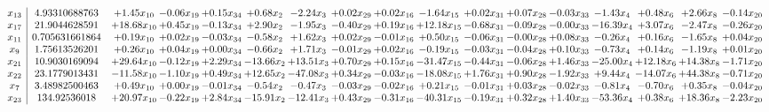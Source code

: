 \documentclass[9pt]{article}
\begin{document}
 \[\begin{array}{c| c c@{\hskip 2pt} c@{\hskip 2pt} c@{\hskip 2pt} c@{\hskip 2pt} c@{\hskip 2pt} c@{\hskip 2pt} c@{\hskip 2pt} c@{\hskip 2pt} c@{\hskip 2pt} c@{\hskip 2pt} c@{\hskip 2pt} c@{\hskip 2pt} c@{\hskip 2pt} c@{\hskip 2pt} c@{\hskip 2pt} }
 x_{13}   &  4.93310688763 & +  1.45 x_{10} & -0.06 x_{19} & +  0.15 x_{34} & +  0.68 x_{2} & -2.24 x_{3} & +  0.02 x_{29} & +  0.02 x_{16} & -1.64 x_{15} & +  0.02 x_{31} & +  0.07 x_{28} & -0.03 x_{33} & -1.43 x_{4} & +  0.48 x_{6} & +  2.66 x_{8} & -0.14 x_{20}\\
 x_{17}   &  21.9044628591 & + 18.68 x_{10} & +  0.45 x_{19} & -0.13 x_{34} & +  2.90 x_{2} & -1.95 x_{3} & -0.40 x_{29} & +  0.19 x_{16} & + 12.18 x_{15} & -0.68 x_{31} & -0.09 x_{28} & -0.00 x_{33} & -16.39 x_{4} & +  3.07 x_{6} & -2.47 x_{8} & -0.26 x_{20}\\
 x_{11}   &  0.705631661864 & +  0.19 x_{10} & +  0.02 x_{19} & -0.03 x_{34} & -0.58 x_{2} & +  1.62 x_{3} & +  0.02 x_{29} & -0.01 x_{16} & +  0.50 x_{15} & -0.06 x_{31} & -0.00 x_{28} & +  0.08 x_{33} & -0.26 x_{4} & +  0.16 x_{6} & -1.65 x_{8} & +  0.04 x_{20}\\
 x_{9}   &  1.75613526201 & +  0.26 x_{10} & +  0.04 x_{19} & +  0.00 x_{34} & -0.66 x_{2} & +  1.71 x_{3} & -0.01 x_{29} & +  0.02 x_{16} & -0.19 x_{15} & -0.03 x_{31} & -0.04 x_{28} & +  0.10 x_{33} & -0.73 x_{4} & +  0.14 x_{6} & -1.19 x_{8} & +  0.01 x_{20}\\
 x_{21}   &  10.9030169094 & + 29.64 x_{10} & -0.12 x_{19} & +  2.29 x_{34} & -13.66 x_{2} & + 13.51 x_{3} & +  0.70 x_{29} & +  0.15 x_{16} & -31.47 x_{15} & -0.44 x_{31} & -0.06 x_{28} & +  1.46 x_{33} & -25.00 x_{4} & + 12.18 x_{6} & + 14.38 x_{8} & -1.71 x_{20}\\
 x_{22}   &  23.1779013431 & -11.58 x_{10} & -1.10 x_{19} & +  0.49 x_{34} & + 12.65 x_{2} & -47.08 x_{3} & +  0.34 x_{29} & -0.03 x_{16} & -18.08 x_{15} & +  1.76 x_{31} & +  0.90 x_{28} & -1.92 x_{33} & +  9.44 x_{4} & -14.07 x_{6} & + 44.38 x_{8} & -0.71 x_{20}\\
 x_{7}   &  3.48982500463 & +  0.49 x_{10} & +  0.00 x_{19} & -0.01 x_{34} & -0.54 x_{2} & -0.47 x_{3} & -0.03 x_{29} & -0.02 x_{16} & +  0.21 x_{15} & -0.01 x_{31} & +  0.03 x_{28} & -0.02 x_{33} & -0.81 x_{4} & -0.70 x_{6} & +  0.35 x_{8} & -0.04 x_{20}\\
 x_{23}   &  134.92536018 & + 20.97 x_{10} & -0.22 x_{19} & +  2.84 x_{34} & -15.91 x_{2} & -12.41 x_{3} & +  0.43 x_{29} & -0.31 x_{16} & -40.31 x_{15} & -0.19 x_{31} & +  0.32 x_{28} & +  1.40 x_{33} & -53.36 x_{4} & +  0.38 x_{6} & + 18.36 x_{8} & -2.23 x_{20}\\

\end{array}\]
\end{document}
